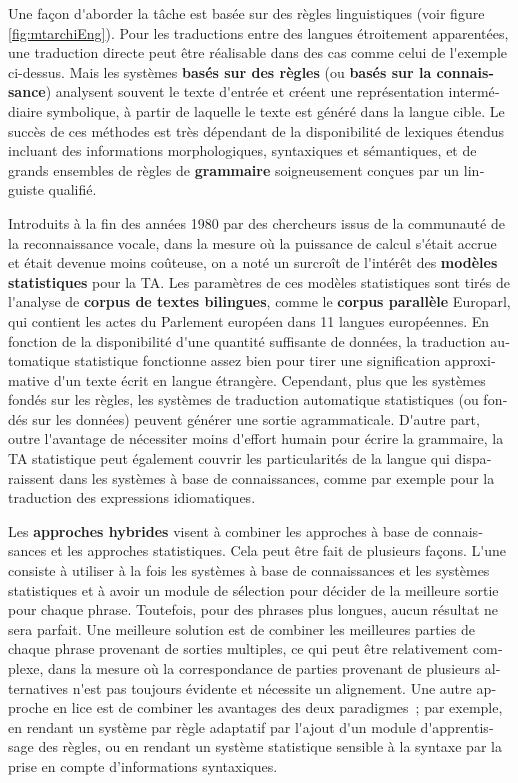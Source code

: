 \begin{french}
\begin{multicols}{2}
Une façon d{\mbox '}aborder la tâche est basée sur des règles
linguistiques (voir figure \ref{fig:mtarchiEng}). Pour les traductions entre des langues étroitement
apparentées, une traduction directe peut être réalisable dans des cas
comme celui de l{\mbox '}exemple ci-dessus. Mais les systèmes {\bf basés sur  des
règles} (ou {\bf basés sur la connaissance}) analysent souvent le texte
d{\mbox '}entrée et créent une représentation intermédiaire symbolique, à
partir de laquelle le texte est généré dans la langue cible.  Le
succès de ces méthodes est très dépendant de la disponibilité de
lexiques étendus incluant des informations morphologiques, syntaxiques
et sémantiques, et de grands ensembles de règles de {\bf grammaire}
soigneusement conçues par un linguiste qualifié.

Introduits à la fin des années 1980 par des chercheurs issus de la
communauté de la reconnaissance vocale, dans la mesure où la puissance
de calcul s{\mbox '}était accrue et était devenue moins coûteuse, on a noté un
surcroît de l{\mbox '}intérêt des {\bf modèles statistiques} pour la TA. Les
paramètres de ces modèles statistiques sont tirés de l{\mbox '}analyse de
{\bf corpus de textes bilingues}, comme le {\bf corpus parallèle} Europarl, qui
contient les actes du Parlement européen dans 11 langues
européennes. En fonction de la disponibilité d{\mbox '}une quantité suffisante
de données, la traduction automatique statistique fonctionne assez bien pour tirer une
signification approximative d{\mbox '}un texte écrit en langue
étrangère. Cependant, plus que les systèmes fondés sur les règles, les
systèmes de traduction automatique statistiques (ou fondés sur les données) peuvent
générer une sortie agrammaticale. D{\mbox '}autre part, outre l{\mbox '}avantage de
nécessiter moins d{\mbox '}effort humain pour écrire la grammaire, la TA
statistique peut également couvrir les particularités de la langue qui
disparaissent dans les systèmes à base de connaissances, comme par
exemple pour la traduction des expressions idiomatiques.

Les {\bf approches hybrides} visent à combiner les approches à base de
connaissances et les approches statistiques. Cela peut être fait de
plusieurs façons. L{\mbox '}une consiste à utiliser à la fois les
systèmes à base de connaissances et les systèmes statistiques et à
avoir un module de sélection pour décider de la meilleure sortie pour
chaque phrase. Toutefois, pour des phrases plus longues, aucun
résultat ne sera parfait. Une meilleure solution est de combiner les
meilleures parties de chaque phrase provenant de sorties multiples, ce
qui peut être relativement complexe, dans la mesure où la
correspondance de parties provenant de plusieurs alternatives n{\mbox
  '}est pas toujours évidente et nécessite un alignement. Une autre
approche en lice est de combiner les avantages des deux paradigmes~;
par exemple, en rendant un système par règle adaptatif par l{\mbox
  '}ajout d{\mbox '}un module d{\mbox '}apprentissage des règles, ou
en rendant un système statistique sensible à la syntaxe par la prise
en compte d'informations syntaxiques.


\end{multicols}
\end{french}
